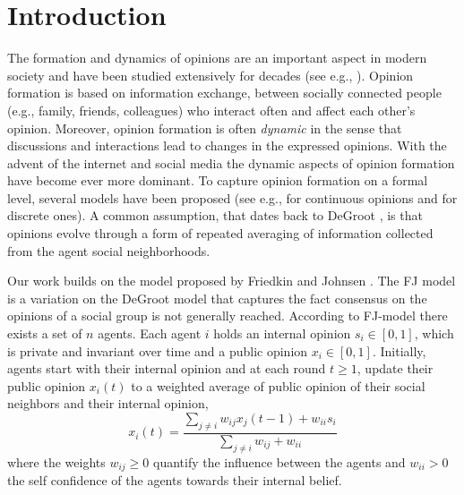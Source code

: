 \section{Introduction}
The formation and dynamics of opinions are an important aspect in modern
society and have been studied extensively for decades (see e.g., \cite{Jackson}).
Opinion formation is based on information exchange, between socially
connected people (e.g., family, friends, colleagues) who interact often
and affect each other's opinion. Moreover, opinion
formation is often \emph{dynamic} in the sense that discussions and
interactions lead to changes in the expressed opinions. With the
advent of the internet and social media the dynamic aspects of
opinion formation have become ever more dominant. To capture opinion formation
on a formal level, several models have been proposed
(see e.g., \cite{DeGroot,FJ90,HK,BKO11} for
continuous opinions and \cite{FGV12,YOASS13,BFM16} for discrete ones).
A common assumption, that dates back to DeGroot \cite{DeGroot}, is
that opinions evolve through a form of repeated averaging of
information collected from the agent social neighborhoods.

Our work builds on the model
proposed by Friedkin and Johnsen \cite{FJ90}.
The FJ model is a variation on the DeGroot model
that captures the fact consensus on the opinions
of a social group is not generally reached.
According to FJ-model there exists a set of $n$ agents.
Each agent $i$ holds an internal opinion $s_i\in [0,1]$, which is private and
invariant over time and a public opinion $x_i \in [0,1]$.
Initially, agents start with their internal opinion and at
each round $t\geq1$, update their public opinion
$x_i(t)$ to a weighted average of public opinion of
their social neighbors and their internal opinion,
%
\begin{equation}\label{eq:FJ_model}
  x_i(t)= \frac{\sum_{j\neq i}w_{ij}x_j(t-1)
    + w_{ii}s_i}{\sum_{j\neq i}w_{ij}+w_{ii}}
\end{equation}
%
where the weights $w_{ij}\geq 0$ quantify the influence between
the agents and $w_{ii}>0$ the self confidence of the agents
towards their internal belief. 

